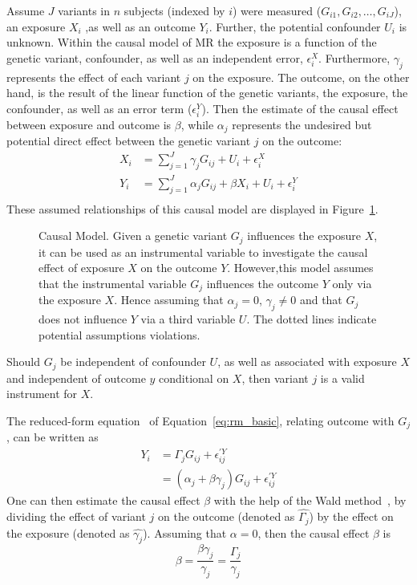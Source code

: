 Assume $J$ variants in $n$ subjects (indexed by $i$) were measured ($G_{i1}, G_{i2}, \ldots , G_{iJ}$),
an exposure $X_i$ ,as well as an outcome $Y_i$.
Further, the potential confounder $U_i$ is unknown. 
Within the causal model of MR the exposure is a function of the genetic variant, confounder, as well as an independent error, $\epsilon_i^X$. 
Furthermore, $\gamma_j$ represents the effect of each variant $j$ on the exposure.
The outcome, on the other hand, is the result of the linear function of the genetic variants, the exposure, the confounder, as well as an error term ($\epsilon_i^Y$).
Then the estimate of the causal effect between exposure and outcome is $\beta$, while $\alpha_j$ represents the undesired but potential direct effect between the genetic variant $j$ on the outcome:
\begin{equation} \label{eq:rm_basic}
  \begin{split}
    X_i &= \sum^J_{j=1} \gamma_jG_{ij} + U_i + \epsilon_i^X \\
    Y_i &= \sum^J_{j=1} \alpha_jG_{ij} + \beta X_i + U_i + \epsilon_i^Y \\
  \end{split}
\end{equation}
These assumed relationships of this causal model are displayed in Figure~\ref{fig:causal}.
\begin{figure}[!h]
  \centering
  \resizebox{0.5\textwidth}{!}{}
  \caption[Causal Model]{Causal Model.
    Given a genetic variant $G_j$ influences the exposure $X$, it can be used as an instrumental variable to investigate the causal effect of exposure $X$ on the outcome $Y$.
    However,this model assumes that the instrumental variable $G_j$ influences the outcome $Y$ only via the exposure $X$.
    Hence assuming that $\alpha_j=0$, $\gamma_j\neq0$ and that $G_j$ does not influence $Y$ via a third variable $U$. 
    The dotted lines indicate potential assumptions violations.
  }\label{fig:causal}
\end{figure}
Should $G_j$ be independent of confounder $U$,
as well as associated with exposure $X$ and independent of outcome $y$ conditional on $X$, then variant $j$ is a valid instrument for $X$.

The reduced-form equation~\cite{Bowden2015} of Equation~\ref{eq:rm_basic}, relating outcome with $G_j$, can be written as
\begin{equation}
	\begin{split}
		Y_i &= \Gamma_j G_{ij} + \epsilon_{ij}^{'Y} \\
		&= (\alpha_j + \beta\gamma_j)G_{ij} + \epsilon_{ij}^{'Y}
	\end{split}
\end{equation}
One can then estimate the causal effect $\beta$ with the help of the Wald method~\cite{Wald1940},
by dividing the effect of variant $j$ on the outcome (denoted as $\hat{\Gamma_j}$) by the effect on the exposure (denoted as $\hat{\gamma_j}$).
Assuming that $\alpha=0$, then the causal effect $\beta$ is
\begin{equation} \label{eq:causal_estiamte}
	\beta = \frac{\beta\gamma_j}{\gamma_j}= \frac{\Gamma_j}{\gamma_j}
\end{equation}

